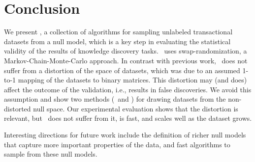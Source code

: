 \section{Conclusion}\label{sec:concl}

We present \algo, a collection of algorithms for sampling unlabeled
transactional datasets from a null model, which is a key step in evaluating the
statistical validity of the results of knowledge discovery tasks. \algo\ uses
swap-randomization, a Markov-Chain-Monte-Carlo approach. In contrast with
previous work, \algo\ does not suffer from a distortion of the space of
datasets, which was due to an assumed 1-to-1 mapping of the datasets to binary
matrices. This distortion may (and does) affect the outcome of the validation,
i.e., results in false discoveries. We avoid this assumption and show two
methods (\naivealgo\ and ) for drawing datasets from the non-distorted
null space. Our experimental evaluation shows that the distortion is relevant,
but \algo\ does not suffer from it, is fast, and scales well as the dataset
grows.

Interesting directions for future work include the definition of richer null
models that capture more important properties of the data, and fast algorithms
to sample from these null models.
